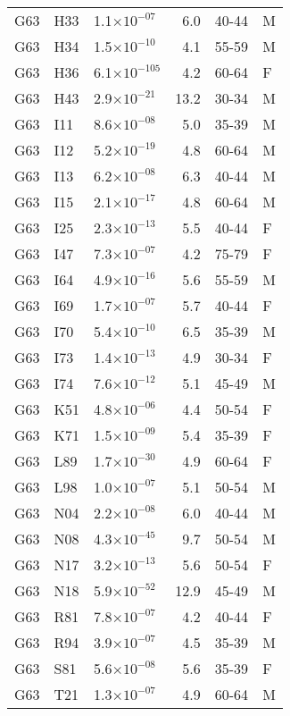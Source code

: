 \begin{longtable}{lllrll}
   G63 & H33 & 1.1$\times10^{-07}$ & 6.0 & 40-44 & M \\ 
   G63 & H34 & 1.5$\times10^{-10}$ & 4.1 & 55-59 & M \\ 
   G63 & H36 & 6.1$\times10^{-105}$ & 4.2 & 60-64 & F \\ 
   G63 & H43 & 2.9$\times10^{-21}$ & 13.2 & 30-34 & M \\ 
   G63 & I11 & 8.6$\times10^{-08}$ & 5.0 & 35-39 & M \\ 
   G63 & I12 & 5.2$\times10^{-19}$ & 4.8 & 60-64 & M \\ 
   G63 & I13 & 6.2$\times10^{-08}$ & 6.3 & 40-44 & M \\ 
   G63 & I15 & 2.1$\times10^{-17}$ & 4.8 & 60-64 & M \\ 
   G63 & I25 & 2.3$\times10^{-13}$ & 5.5 & 40-44 & F \\ 
   G63 & I47 & 7.3$\times10^{-07}$ & 4.2 & 75-79 & F \\ 
   G63 & I64 & 4.9$\times10^{-16}$ & 5.6 & 55-59 & M \\ 
   G63 & I69 & 1.7$\times10^{-07}$ & 5.7 & 40-44 & F \\ 
   G63 & I70 & 5.4$\times10^{-10}$ & 6.5 & 35-39 & M \\ 
   G63 & I73 & 1.4$\times10^{-13}$ & 4.9 & 30-34 & F \\ 
   G63 & I74 & 7.6$\times10^{-12}$ & 5.1 & 45-49 & M \\ 
   G63 & K51 & 4.8$\times10^{-06}$ & 4.4 & 50-54 & F \\ 
   G63 & K71 & 1.5$\times10^{-09}$ & 5.4 & 35-39 & F \\ 
   G63 & L89 & 1.7$\times10^{-30}$ & 4.9 & 60-64 & F \\ 
   G63 & L98 & 1.0$\times10^{-07}$ & 5.1 & 50-54 & M \\ 
   G63 & N04 & 2.2$\times10^{-08}$ & 6.0 & 40-44 & M \\ 
   G63 & N08 & 4.3$\times10^{-45}$ & 9.7 & 50-54 & M \\ 
   G63 & N17 & 3.2$\times10^{-13}$ & 5.6 & 50-54 & F \\ 
   G63 & N18 & 5.9$\times10^{-52}$ & 12.9 & 45-49 & M \\ 
   G63 & R81 & 7.8$\times10^{-07}$ & 4.2 & 40-44 & F \\ 
   G63 & R94 & 3.9$\times10^{-07}$ & 4.5 & 35-39 & M \\ 
   G63 & S81 & 5.6$\times10^{-08}$ & 5.6 & 35-39 & F \\ 
   G63 & T21 & 1.3$\times10^{-07}$ & 4.9 & 60-64 & M \\ 

\end{longtable}
